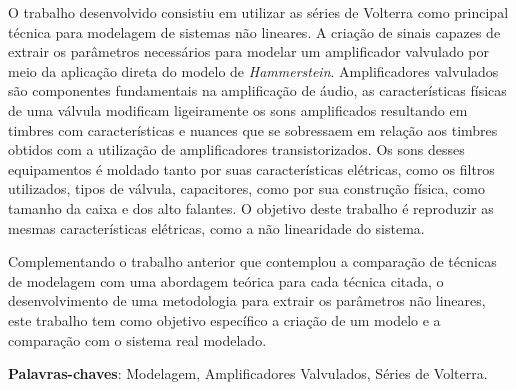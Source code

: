 \begin{resumo}

 O trabalho desenvolvido consistiu em utilizar as séries de Volterra como principal técnica para modelagem de sistemas não lineares. A criação de sinais capazes de extrair os parâmetros necessários para modelar um amplificador valvulado por meio da aplicação direta do modelo de \textit{Hammerstein}. Amplificadores valvulados são componentes fundamentais na amplificação de áudio, as características físicas de uma válvula modificam ligeiramente os sons amplificados resultando em timbres com características e nuances que se sobressaem em relação aos timbres obtidos com a utilização de amplificadores transistorizados. Os sons desses equipamentos é moldado tanto por suas características elétricas, como os filtros utilizados, tipos de válvula, capacitores, como por sua construção física, como tamanho da caixa e dos alto falantes. O objetivo deste trabalho é reproduzir as mesmas características elétricas, como a não linearidade do sistema.
 
 Complementando o trabalho anterior que contemplou a comparação de técnicas de modelagem com uma abordagem teórica para cada técnica citada, o desenvolvimento de uma metodologia para extrair os parâmetros não lineares, este trabalho tem como objetivo específico a criação de um modelo e a comparação com o sistema real modelado.

 \vspace{\onelineskip}
    
 \noindent
 \textbf{Palavras-chaves}: Modelagem, Amplificadores Valvulados, Séries de Volterra.
\end{resumo}
